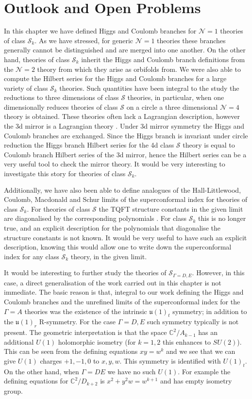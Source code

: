 \documentclass[main.tex]{subfiles}
\begin{document}
\section{Outlook and Open Problems}
In this chapter we have defined Higgs and Coulomb branches for $\mathcal{N}=1$ theories of class $\mathcal{S}_k$. As we have stressed, for generic $\mathcal{N}=1$ theories these branches generally cannot be distinguished and are merged into one another. On the other hand, theories of class $\mathcal{S}_k$ inherit the Higgs and Coulomb branch definitions from the $\mathcal{N}=2$ theory from which they arise as orbifolds from.
We were also able to compute the Hilbert series for the Higgs and Coulomb branches for a large variety of class $\mathcal{S}_k$ theories. Such quantities have been integral to the study the reductions to three dimensions of class $\mathcal{S}$ theories, in particular, when one dimensionally reduces theories of class $\mathcal{S}$ on a circle a three dimensional $\mathcal{N}=4$ theory is obtained. These theories often lack a Lagrangian description, however the 3d mirror is a Lagrangian theory \cite{Benini:2010uu}. Under 3d mirror symmetry the Higgs and Coulomb branches are exchanged. Since the Higgs branch is invariant under circle reduction the Higgs branch Hilbert series for the 4d class $\mathcal{S}$ theory is equal to Coulomb branch Hilbert series of the 3d mirror, hence the Hilbert series can be a very useful tool to check the mirror theory. It would be very interesting to investigate this story for theories of class $\mathcal{S}_k$.

Additionally, we have also been able to define analogues of the Hall-Littlewood, Coulomb, Macdonald and Schur limits of the superconformal index for theories of class $\mathcal{S}_k$. For theories of class $\mathcal{S}$ the TQFT structure constants in the given limit are diagonalised by the corresponding polynomials \cite{Gadde:2011uv}. For class $\mathcal{S}_k$ this is no longer true, and an explicit description for the polynomials that diagonalise the structure constants is not known. It would be very useful to have such an explicit description, knowing this would allow one to write down the superconformal index for any class $\mathcal{S}_k$ theory, in the given limit.

It would be interesting to further study the theories of $\mathcal{S}_{\Gamma=D,E}$. However, in this case, a direct generalisation of the work carried out in this chapter is not immediate. The basic reason is that, integral to our work defining the Higgs and Coulomb branches and the unrefined limits of the superconformal index for the $\Gamma=A$ theories was the existence of the intrinsic $\mathfrak{u}(1)_t$ symmetry; in addition to the $\mathfrak{u}(1)_r$ R-symmetry. For the case $\Gamma=D,E$ such symmetry typically is not present. The geometric interpretation is that the space $\mathbb{C}^2/A_{k-1}$ has an additional $U(1)$ holomorphic isometry (for $k=1,2$ this enhances to $SU(2)$). This can be seen from the defining equations $xy=w^{k}$ and we see that we can give $U(1)$ charges $+1,-1,0$ to $x,y,w$. This symmetry is identified with $U(1)_t$. On the other hand, when $\Gamma=DE$ we have no such $U(1)$. For example the defining equations for $\mathbb{C}^2/D_{k+2}$ is $x^2+y^2w=w^{k+1}$ and has empty isometry group.
\end{document}
